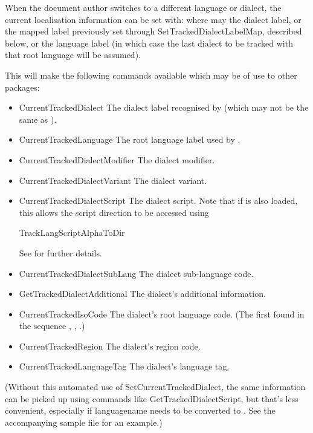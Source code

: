 \documentclass[titlepage=false,oneside,
 fontsize=12pt,captions=tableheading]{scrbook}
\begin{document}
When the document author switches to a different language or
dialect, the current localisation information can be set with:
where  may the  dialect label,
or the mapped label previously set through \gls{SetTrackedDialectLabelMap},
described below, or the language label (in which case the
last dialect to be tracked with that root language will
be assumed).

This will make the following commands available which may be
of use to other packages:
\begin{itemize}
\item\gls{CurrentTrackedDialect} The dialect label recognised
by  (which may not be the same as ).

\item\gls{CurrentTrackedLanguage}
The root language label used by .

\item\gls{CurrentTrackedDialectModifier} The dialect modifier.

\item\gls{CurrentTrackedDialectVariant} The dialect variant.

\item\gls{CurrentTrackedDialectScript} The dialect script.
Note that if  is also loaded, this allows the
script direction to be accessed using
\begin{codebox}
\gls{TrackLangScriptAlphaToDir}
\end{codebox}
See  for further details.

\item\gls{CurrentTrackedDialectSubLang} The dialect sub-language
code.

\item\gls{GetTrackedDialectAdditional} The dialect's additional
information.

\item\gls{CurrentTrackedIsoCode} The dialect's root language 
 code. (The first found in the sequence ,
, .)

\item\gls{CurrentTrackedRegion} The dialect's  region 
code.

\item\gls{CurrentTrackedLanguageTag} The dialect's language tag.

\end{itemize}
(Without this automated use of \gls{SetCurrentTrackedDialect},
the same information can be picked up using commands
like \gls{GetTrackedDialectScript}, but that's less convenient,
especially if \gls{languagename} needs to be converted
to . See the accompanying sample file
 for an example.)
\end{document}
